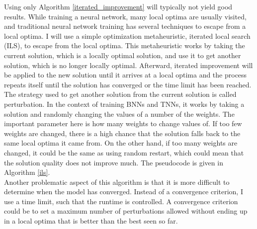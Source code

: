 \noindent Using only Algorithm \ref{iterated_improvement} will typically not yield good results. While training a neural network, many local optima are usually visited, and traditional neural network training has several techniques to escape from a local optima. I will use a simple optimization metaheuristic, iterated local search (ILS), to escape from the local optima. This metaheuristic works by taking the current solution, which is a locally optimal solution, and use it to get another solution, which is no longer locally optimal. Afterward, iterated improvement will be applied to the new solution until it arrives at a local optima and the process repeats itself until the solution has converged or the time limit has been reached. The strategy used to get another solution from the current solution is called perturbation. In the context of training BNNs and TNNs, it works by taking a solution and randomly changing the values of a number of the weights. The important parameter here is how many weights to change values of. If too few weights are changed, there is a high chance that the solution falls back to the same local optima it came from. On the other hand, if too many weights are changed, it could be the same as using random restart, which could mean that the solution quality does not improve much. The pseudocode is given in Algorithm \ref{ils}. \\

\noindent Another problematic aspect of this algorithm is that it is more difficult to determine when the model has converged. Instead of a convergence criterion, I use a time limit, such that the runtime is controlled. A convergence criterion could be to set a maximum number of perturbations allowed without ending up in a local optima that is better than the best seen so far. 

